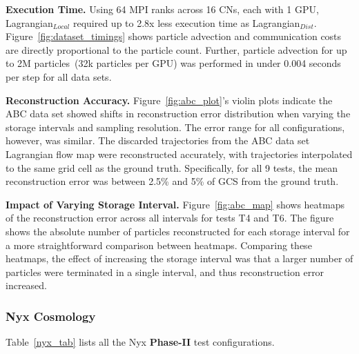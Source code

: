 \textbf{Execution Time.} Using 64 MPI ranks across 16 CNs, each with 1 GPU, Lagrangian$_{Local}$ required up to 2.8x less execution time as Lagrangian$_{Dist}$.
%
Figure~\ref{fig:dataset_timings} shows particle advection and communication costs are directly proportional to the particle count.
%
Further, particle advection for up to 2M particles~(32k particles per GPU) was performed in under 0.004 seconds per step for all data sets.
%


\textbf{Reconstruction Accuracy.} Figure~\ref{fig:abc_plot}'s violin plots indicate the ABC data set showed shifts in reconstruction error distribution when varying the storage intervals and sampling resolution. 
%
The error range for all configurations, however, was similar.
%
The discarded trajectories from the ABC data set Lagrangian flow map were reconstructed accurately, with trajectories interpolated to the same grid cell as the ground truth.
%
Specifically, for all 9 tests, the mean reconstruction error was between 2.5\% and 5\% of GCS from the ground truth.
%


\textbf{Impact of Varying Storage Interval.} Figure~\ref{fig:abc_map} shows heatmaps of the reconstruction error across all intervals for tests T4 and T6.
%
The figure shows the absolute number of particles reconstructed for each storage interval for a more straightforward comparison between heatmaps.
%
Comparing these heatmaps, the effect of increasing the storage interval was that a larger number of particles were terminated in a single interval, and thus reconstruction error increased. 
%
%

\vspace{-2mm}
\subsubsection{Nyx Cosmology}
\label{sec:nyx}
Table~\ref{nyx_tab} lists all the Nyx \textbf{Phase-II} test configurations. 
%


